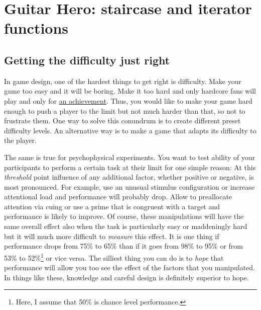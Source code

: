 \documentclass[
]{book}
\begin{document}
\hypertarget{seminar-02-06}{%
\chapter{Guitar Hero: staircase and iterator functions}\label{seminar-02-06}}

\hypertarget{getting-the-difficulty-just-right}{%
\section{Getting the difficulty just right}\label{getting-the-difficulty-just-right}}

In game design, one of the hardest things to get right is difficulty. Make your game too easy and it will be boring. Make it too hard and only hardcore fans will play and only for \href{https://www.imdb.com/title/tt4975856/}{an achievement}. Thus, you would like to make your game hard enough to push a player to the limit but not much harder than that, so not to frustrate them. One way to solve this conundrum is to create different preset difficulty levels. An alternative way is to make a game that adapts its difficulty to the player.

The same is true for psychophysical experiments. You want to test ability of your participants to perform a certain task at their limit for one simple reason: At this \emph{threshold} point influence of any additional factor, whether positive or negative, is most pronounced. For example, use an unusual stimulus configuration or increase attentional load and performance will probably drop. Allow to preallocate attention via cuing or use a prime that is congruent with a target and performance is likely to improve. Of course, these manipulations will have the same overall effect also when the task is particularly easy or maddeningly hard but it will much more difficult to \emph{measure} this effect. It is one thing if performance drops from 75\% to 65\% than if it goes from 98\% to 95\% or from 53\% to 52\%\footnote{Here, I assume that 50\% is chance level performance.} or vice versa. The silliest thing you can do is to \emph{hope} that performance will allow you too see the effect of the factors that you manipulated. In things like these, knowledge and careful design is definitely superior to hope.
\end{document}
